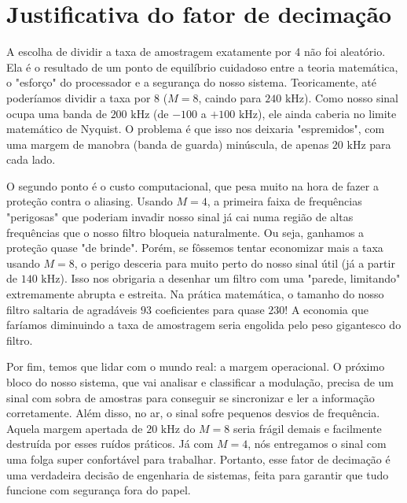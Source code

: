 \section{Justificativa do fator de decimação}

A escolha de dividir a taxa de amostragem exatamente por 4 não foi aleatório. Ela é o resultado de um ponto de equilíbrio cuidadoso entre a teoria matemática, o "esforço" do processador e a segurança do nosso sistema. Teoricamente, até poderíamos dividir a taxa por 8 ($M=8$, caindo para $240\text{ kHz}$). Como nosso sinal ocupa uma banda de $200\text{ kHz}$ (de $-100$ a $+100\text{ kHz}$), ele ainda caberia no limite matemático de Nyquist. O problema é que isso nos deixaria "espremidos", com uma margem de manobra (banda de guarda) minúscula, de apenas $20\text{ kHz}$ para cada lado.

O segundo ponto é o custo computacional, que pesa muito na hora de fazer a proteção contra o aliasing. Usando $M=4$, a primeira faixa de frequências "perigosas" que poderiam invadir nosso sinal já cai numa região de altas frequências que o nosso filtro bloqueia naturalmente. Ou seja, ganhamos a proteção quase "de brinde". Porém, se fôssemos tentar economizar mais a taxa usando $M=8$, o perigo desceria para muito perto do nosso sinal útil (já a partir de $140\text{ kHz}$). Isso nos obrigaria a desenhar um filtro com uma "parede, limitando" extremamente abrupta e estreita. Na prática matemática, o tamanho do nosso filtro saltaria de agradáveis $93$ coeficientes para quase $230$! A economia que faríamos diminuindo a taxa de amostragem seria engolida pelo peso gigantesco do filtro.

Por fim, temos que lidar com o mundo real: a margem operacional. O próximo bloco do nosso sistema, que vai analisar e classificar a modulação, precisa de um sinal com sobra de amostras para conseguir se sincronizar e ler a informação corretamente. Além disso, no ar, o sinal sofre pequenos desvios de frequência. Aquela margem apertada de $20\text{ kHz}$ do $M=8$ seria frágil demais e facilmente destruída por esses ruídos práticos. Já com $M=4$, nós entregamos o sinal com uma folga super confortável para trabalhar. Portanto, esse fator de decimação é uma verdadeira decisão de engenharia de sistemas, feita para garantir que tudo funcione com segurança fora do papel.